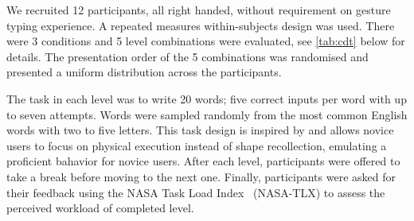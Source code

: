 \documentclass{chi-ext}
\begin{document}

We recruited 12 participants, all right handed, without requirement on gesture typing experience. A repeated measures within-subjects design was used. There were 3 conditions and 5 level combinations were evaluated, see \autoref{tab:cdt} below for details. The presentation order of the 5 combinations was randomised and presented a uniform distribution across the participants.

The task in each level was to write 20 words; five correct inputs per word with up to seven attempts. Words were sampled randomly from the most common English words with two to five letters. This task design is inspired by \cite{Quinn2016} and allows novice users to focus on physical execution instead of shape recollection, emulating a proficient bahavior for novice users. After each level, participants were offered to take a break before moving to the next one. Finally, participants were asked for their feedback using the NASA Task Load Index~\cite{Hart1988} (NASA-TLX) to assess the perceived workload of completed level.
\end{document}

